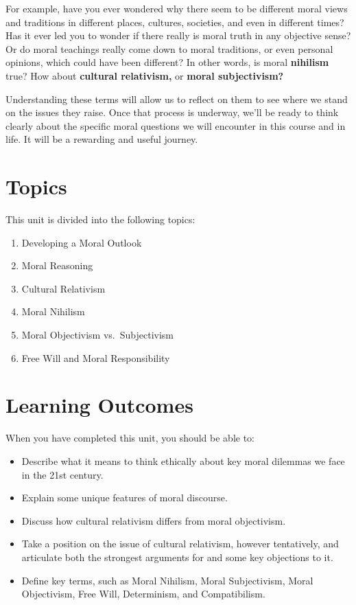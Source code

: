 \documentclass[
]{book}
\providecommand{\tightlist}{%
  \setlength{\itemsep}{0pt}\setlength{\parskip}{0pt}}
\begin{document}
For example, have you ever wondered why there seem to be different moral views and traditions in different places, cultures, societies, and even in different times? Has it ever led you to wonder if there really is moral truth in any objective sense? Or do moral teachings really come down to moral traditions, or even personal opinions, which could have been different? In other words, is moral \textbf{nihilism} true? How about \textbf{cultural relativism,} or \textbf{moral subjectivism?}

Understanding these terms will allow us to reflect on them to see where we stand on the issues they raise. Once that process is underway, we'll be ready to think clearly about the specific moral questions we will encounter in this course and in life. It will be a rewarding and useful journey.

\hypertarget{topics}{%
\section*{Topics}\label{topics}}

This unit is divided into the following topics:

\begin{enumerate}
\def\labelenumi{\arabic{enumi}.}
\tightlist
\item
  Developing a Moral Outlook
\item
  Moral Reasoning
\item
  Cultural Relativism
\item
  Moral Nihilism
\item
  Moral Objectivism vs.~Subjectivism
\item
  Free Will and Moral Responsibility
\end{enumerate}

\hypertarget{learning-outcomes}{%
\section*{Learning Outcomes}\label{learning-outcomes}}

When you have completed this unit, you should be able to:

\begin{itemize}
\tightlist
\item
  Describe what it means to think ethically about key moral dilemmas we face in the 21st century.
\item
  Explain some unique features of moral discourse.
\item
  Discuss how cultural relativism differs from moral objectivism.
\item
  Take a position on the issue of cultural relativism, however tentatively, and articulate both the strongest arguments for and some key objections to it.
\item
  Define key terms, such as Moral Nihilism, Moral Subjectivism, Moral Objectivism, Free Will, Determinism, and Compatibilism.
\end{itemize}
\end{document}
